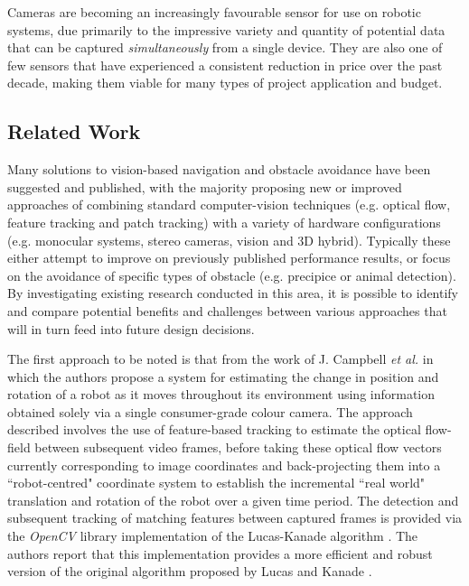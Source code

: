 Cameras are becoming an increasingly favourable sensor for use on robotic systems, due primarily to the impressive variety and quantity of potential data that can be captured \textit{simultaneously} from a single device. They are also one of few sensors that have experienced a consistent reduction in price over the past decade, making them viable for many types of project application and budget. 

\subsection{Related Work}

Many solutions to vision-based navigation and obstacle avoidance have been suggested and published, with the majority proposing new or improved approaches of combining standard computer-vision techniques (e.g. optical flow, feature tracking and patch tracking) with a variety of hardware configurations (e.g. monocular systems, stereo cameras, vision and 3D hybrid). Typically these either attempt to improve on previously published performance results, or focus on the avoidance of specific types of obstacle (e.g. precipice or animal detection). By investigating existing research conducted in this area, it is possible to identify and compare potential benefits and challenges between various approaches that will in turn feed into future design decisions.

The first approach to be noted is that from the work of J. Campbell \textit{et al.} \cite{j-campbell} in which the authors propose a system for estimating the change in position and rotation of a robot as it moves throughout its environment using information obtained solely via a single consumer-grade colour camera. The approach described involves the use of feature-based tracking to estimate the optical flow-field between subsequent video frames, before taking these optical flow vectors currently corresponding to image coordinates and back-projecting them into a ``robot-centred" coordinate system to establish the incremental ``real world" translation and rotation of the robot over a given time period. The detection and subsequent tracking of matching features between captured frames is provided via the \textit{OpenCV} library implementation of the Lucas-Kanade algorithm \cite{opencv-lucas-kanade-features}. The authors report that this implementation provides a more efficient and robust version of the original algorithm proposed by Lucas and Kanade \cite{lucas-kanade-features}. 

